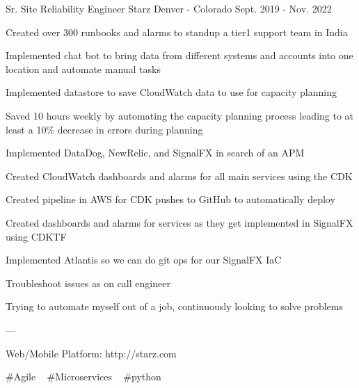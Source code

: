 \begin{cventries}
  \cventry
    {Sr. Site Reliability Engineer} %
    {Starz} %
    {Denver - Colorado} %
    {Sept. 2019 - Nov. 2022} %
    {
      \begin{cvitems} %
        \item {Created over 300 runbooks and alarms to standup a tier1 support team in India}
        \item {Implemented chat bot to bring data from different systems and accounts into one location and automate manual tasks}
        \item {Implemented datastore to save CloudWatch data to use for capacity planning}
        \item {Saved 10 hours weekly by automating the capacity planning process leading to at least a 10\% decrease in errors during planning}
        \item {Implemented DataDog, NewRelic, and SignalFX in search of an APM}
        \item {Created CloudWatch dashboards and alarms for all main services using the CDK}
        \item {Created pipeline in AWS for CDK pushes to GitHub to automatically deploy}
        \item {Created dashboards and alarms for services as they get implemented in SignalFX using CDKTF}
        \item {Implemented Atlantis so we can do git ops for our SignalFX IaC}
        \item {Troubleshoot issues as on call engineer}
        \item {Trying to automate myself out of a job, continuously looking to solve problems}
        \item {---}
        \item {Web/Mobile Platform: http://starz.com}
      \end{cvitems}
    }
    {
      \#Agile ~
      \#Microservices ~
      \#python ~
    }


\end{cventries}
